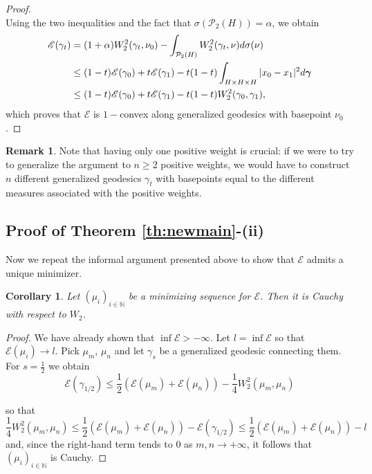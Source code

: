 \documentclass[12pt,a4paper]{article}
\newcommand{\N}{\mathbb{N}}
\renewcommand{\d}{{\rm d}}
\newcommand{\g}{\boldsymbol{\gamma}}
\newcommand{\X}{\mathcal{P}_2(H)}
\theoremstyle{plain}
\newtheorem{corollary}[theorem]{Corollary}
\theoremstyle{definition}
\newtheorem{remark}[theorem]{Remark}
\begin{document}
\begin{proof}
\begin{equation*}
    \end{equation*}
    Using the two inequalities and the fact that $\sigma(\X)=\alpha$, we obtain
    \begin{equation*}
    \begin{split}
         \mathscr{E}(\gamma_t) &= (1+\alpha) W_2^2(\gamma_t, \nu_0) - \int_{\X}  W_2^2(\gamma_t, \nu)\d\sigma(\nu)\\
         &\leq (1-t) \mathscr{E}(\gamma_0) + t\mathscr{E}(\gamma_1) - t(1-t) \int_{H \times H \times H} |x_{0}-x_1|^2 \d\g \\
        &\leq (1-t) \mathscr{E}(\gamma_0) + t\mathscr{E}(\gamma_1) - t (1-t) W_2^2(\gamma_0, \gamma_1),
    \end{split}
    \end{equation*}
    which proves that $\mathscr{E}$ is $1-$convex along generalized geodesics with basepoint $\nu_0$.
\end{proof}
\begin{remark}
\label{rem:basepoints}
    Note that having only one positive weight is crucial: if we were to try to generalize the argument to $n\geq 2$ positive weights, we would have to construct $n$ different generalized geodesics $\gamma_t$ with basepoints equal to the different measures associated with the positive weights. 
\end{remark}


\subsection{Proof of Theorem \ref{th:newmain}-(ii)}
Now we repeat the informal argument presented above to show that $\mathscr{E}$ admits a unique minimizer.

\begin{corollary}\label{cauchy}
    Let $(\mu_i)_{i \in \mathbb{N}}$ be a minimizing sequence for $\mathscr{E}$. Then it is Cauchy with respect to $W_2$.
\end{corollary}
\begin{proof}
    We have already shown that $\inf \mathscr{E} > - \infty$. Let $l = \inf \mathscr{E}$ so that $\mathscr{E}(\mu_i) \to l$. Pick $\mu_m$, $\mu_n$ and let $\gamma_s$ be a generalized geodesic connecting them. For $s=\frac12$ we obtain
    $$
    \mathscr{E}(\gamma_{1/2}) \leq \frac{1}{2}(\mathscr{E}(\mu_m) + \mathscr{E}(\mu_n)) - \frac{1}{4}W_2^2(\mu_m,\mu_n)$$

    so that 
    $$
    \frac{1}{4}W_2^2(\mu_m,\mu_n) \leq \frac{1}{2}(\mathscr{E}(\mu_m) + \mathscr{E}(\mu_n)) - \mathscr{E}(\gamma_{1/2}) \leq \frac{1}{2}(\mathscr{E}(\mu_m) + \mathscr{E}(\mu_n)) - l
    $$
    and, since the right-hand term tends to $0$ as $m,n \to +\infty$, it follows that $(\mu_i)_{i \in \N}$ is Cauchy.
\end{proof}
\end{document}
